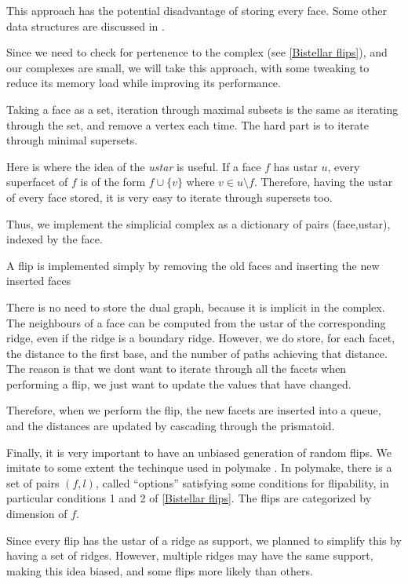 \documentclass[12pt,a4paper]{article}
\theoremstyle{plain}
\theoremstyle{definition}
\begin{document}
This approach has the potential disadvantage of storing every face. Some other data structures are discussed in \cite{data structure}.

Since we need to check for pertenence to the complex (see \ref{Bistellar flips}), and our complexes are small, we will take this approach, with some tweaking to reduce its memory load while improving its performance.

Taking a face as a set, iteration through maximal subsets is the same as iterating through the set, and remove a vertex each time. The hard part is to iterate through minimal supersets.

Here is where the idea of the \emph{ustar} is useful. If a face $f$ has ustar $u$, every superfacet of $f$ is of the form $f\cup\{v\}$ where $v\in u\setminus f$. Therefore, having the ustar of every face stored, it is very easy to iterate through supersets too.

Thus, we implement the simplicial complex as a dictionary of pairs (face,ustar), indexed by the face.

A flip is implemented simply by removing the old faces and inserting the new inserted faces

There is no need to store the dual graph, because it is implicit in the complex. The neighbours of a face can be computed from the ustar of the corresponding ridge, even if the ridge is a boundary ridge. However, we do store, for each facet, the distance to the first base, and the number of paths achieving that distance. The reason is that we dont want to iterate through all the facets when performing a flip, we just want to update the values that have changed.

Therefore, when we perform the flip, the new facets are inserted into a queue, and the distances are updated by cascading through the prismatoid.

Finally, it is very important to have an unbiased generation of random flips. We imitate to some extent the techinque used in polymake \cite{polymake}. In polymake, there is a set of pairs $(f,l)$, called ``options'' satisfying some conditions for flipability, in particular conditions 1 and 2 of \ref{Bistellar flips}. The flips are categorized by dimension of $f$.

Since every flip has the ustar of a ridge as support, we planned to simplify this by having a set of ridges. However, multiple ridges may have the same support, making this idea biased, and some flips more likely than others.
\end{document}
